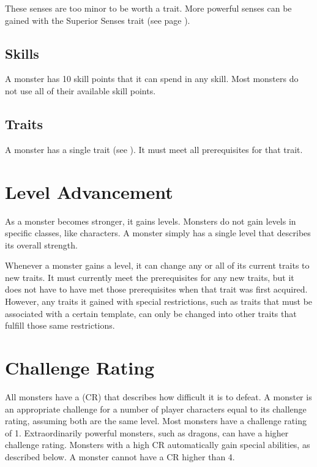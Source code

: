         These senses are too minor to be worth a trait.
        More powerful senses can be gained with the Superior Senses trait (see page ).

    \subsection{Skills}
        A monster has 10 skill points that it can spend in any skill.
        Most monsters do not use all of their available skill points.

    \subsection{Traits}
        A monster has a single trait (see ).
        It must meet all prerequisites for that trait.

\section{Level Advancement}\label{Level Advancement}

    As a monster becomes stronger, it gains levels.
    Monsters do not gain levels in specific classes, like characters.
    A monster simply has a single level that describes its overall strength.

    Whenever a monster gains a level, it can change any or all of its current traits to new traits.
    It must currently meet the prerequisites for any new traits, but it does not have to have met those prerequisites when that trait was first acquired.
    However, any traits it gained with special restrictions, such as traits that must be associated with a certain template, can only be changed into other traits that fulfill those same restrictions.

\section{Challenge Rating}
    All monsters have a  (CR) that describes how difficult it is to defeat.
    A monster is an appropriate challenge for a number of player characters equal to its challenge rating, assuming both are the same level.
    Most monsters have a challenge rating of 1.
    Extraordinarily powerful monsters, such as dragons, can have a higher challenge rating.
    Monsters with a high CR automatically gain special abilities, as described below.
    A monster cannot have a CR higher than 4.

